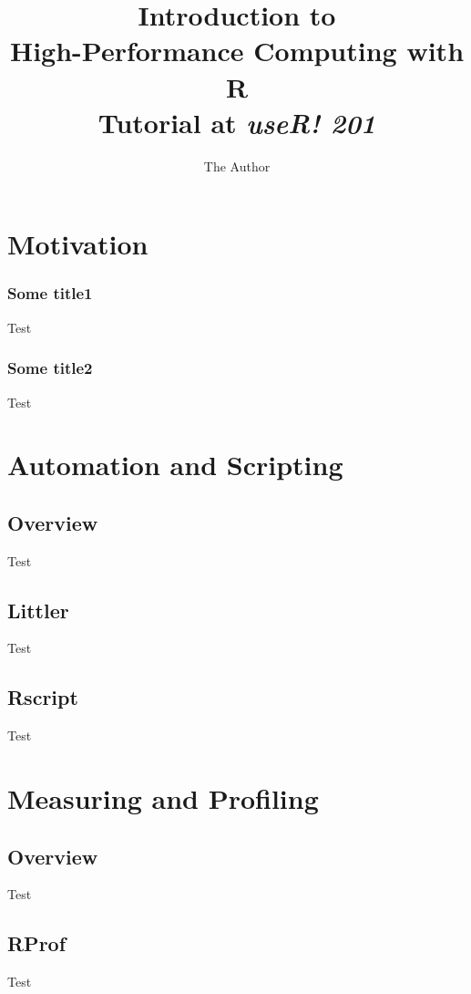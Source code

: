\documentclass    [10pt, compress]{beamer}
\title[Intro. to High-Perf. Computing ]{Introduction to\\ High-Performance Computing with R\\
\small Tutorial at \textit{useR! 201}}
\author{The Author}
\begin{document}
\begin{frame}
\maketitle
\end{frame}

\section{Motivation}
\begin{frame}\frametitle{Some title1}
Test
\end{frame}
\begin{frame}\frametitle{Some title2}
Test
\end{frame}

\section{Automation and Scripting}
\subsection{Overview}
\begin{frame}Test\end{frame}
\subsection{Littler}
\begin{frame}Test\end{frame}
\subsection{Rscript}
\begin{frame}Test\end{frame}

\section{Measuring and Profiling}
\subsection{Overview}
\begin{frame}Test\end{frame}
\subsection{RProf}
\begin{frame}Test\end{frame}
\end{document}
